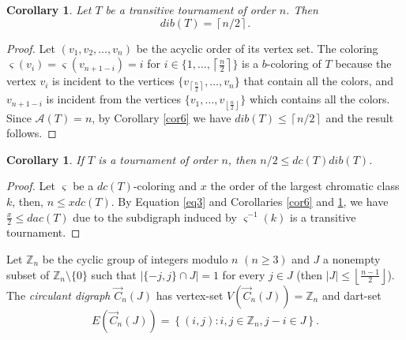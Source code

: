 \documentclass[12pt]{article}
\newtheorem{corollary}[theorem]{Corollary}
\begin{document}
\begin{corollary}\label{cor7}
Let $T$ be a transitive tournament of order $n$. Then \[dib(T)=
\left\lceil {n}/{2}\right\rceil.\]
\end{corollary}
\begin{proof}

Let $(v_1,v_2,\dots,v_{n})$ be the acyclic order of its vertex set. The coloring $\varsigma(v_i)=\varsigma(v_{n+1-i})=i$ for $i\in \{1,\dots,\left\lceil \frac{n}{2}\right\rceil\}$ is a $b$-coloring of $T$ because the vertex $v_i$ is incident to the vertices $\{v_{\left\lceil\frac{n}{2}\right\rceil},\dots,v_n\}$ that contain all the colors, and $v_{n+1-i}$ is incident from the vertices $\{v_1,\dots,v_{\left\lfloor\frac{n}{2}\right\rfloor}\}$ which contains all the colors. Since $\mathcal{A}(T)=n$, by Corollary \ref{cor6} we have $dib(T)\leq
\left\lceil {n}/{2}\right\rceil$ and the result follows.
\end{proof}

\begin{corollary}\label{cor8}
If $T$ is a tournament of order $n$, then $n/2\leq dc(T)dib(T)$.
\end{corollary}
\begin{proof}
Let $\varsigma$ be a $dc(T)$-coloring and $x$ the order of the largest chromatic class $k$, then, $n\leq xdc(T)$. By Equation \ref{eq3} and Corollaries \ref{cor6} and \ref{cor7}, we have $\frac{x}{2} \leq dac(T)$ due to the subdigraph induced by $\varsigma^{-1}(k)$ is a transitive tournament.
\end{proof}

Let $\mathbb{Z}_{n}$ be the cyclic group of integers modulo $n$ $(n\geq 3)$ and $J$ a nonempty subset of $\mathbb{Z}_{n}\setminus \{0\}$ such that $\left\vert \{-j,j\}\cap J\right\vert =1$ for every $j\in J$ (then $|J|\leq \left\lfloor \frac{n-1}{2}\right\rfloor$). The \emph{circulant digraph} $\overrightarrow{C}_{n}(J)$ has vertex-set $V(\overrightarrow{C}_{n}(J))=\mathbb{Z}_{n}$ and dart-set 
\[E(\overrightarrow{C}_{n}(J))=\left\{ (i,j):i,j\in \mathbb{Z}_{n},j-i\in J\right\}.\]
\end{document}
